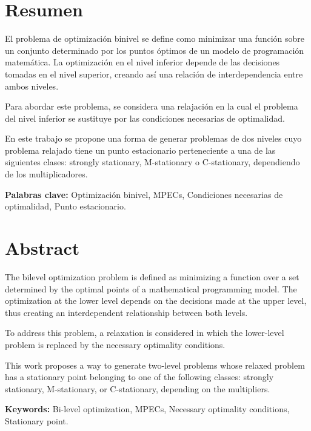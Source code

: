 \chapter*{Resumen}

El problema de optimización binivel se define como minimizar una función sobre un conjunto determinado por los puntos óptimos de un modelo de programación matemática. La optimización en el nivel inferior depende de las decisiones tomadas en el nivel superior, creando así una relación de interdependencia entre ambos niveles.

Para abordar este problema, se considera una relajación en la cual el problema del nivel inferior se sustituye por las condiciones necesarias de optimalidad.

En este trabajo se propone una forma de generar problemas de dos niveles cuyo problema relajado tiene un punto estacionario perteneciente a una de las siguientes clases: strongly stationary, M-stationary o C-stationary, dependiendo de los multiplicadores.


\textbf{Palabras clave:} Optimización binivel, MPECs, Condiciones necesarias de optimalidad, Punto estacionario.

\chapter*{Abstract}
The bilevel optimization problem is defined as minimizing a function over a set determined by the optimal points of a mathematical programming model. The optimization at the lower level depends on the decisions made at the upper level, thus creating an interdependent relationship between both levels.

To address this problem, a relaxation is considered in which the lower-level problem is replaced by the necessary optimality conditions.

This work proposes a way to generate two-level problems whose relaxed problem has a stationary point belonging to one of the following classes: strongly stationary, M-stationary, or C-stationary, depending on the multipliers.

\textbf{Keywords:} Bi-level optimization, MPECs, Necessary optimality conditions, Stationary point.
